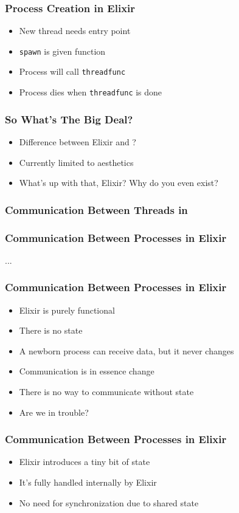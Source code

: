 \begin{frame}
    \frametitle{Process Creation in Elixir}
    \begin{itemize}
        \item New thread needs entry point
        \item \texttt{spawn} is given function
        \item Process will call \texttt{threadfunc}
        \item Process dies when \texttt{threadfunc} is done
    \end{itemize}
\end{frame}

\begin{frame}
    \frametitle{So What's The Big Deal?}
    \begin{itemize}
        \item Difference between Elixir and \csharp?
        \item Currently limited to aesthetics
        \item What's up with that, Elixir? Why do you even exist?
    \end{itemize}
\end{frame}

\begin{frame}
    \frametitle{Communication Between Threads in \csharp}
\end{frame}

\begin{frame}
    \frametitle{Communication Between Processes in Elixir}
    \begin{center}
        \Huge ...
    \end{center}
\end{frame}

\begin{frame}
    \frametitle{Communication Between Processes in Elixir}
    \begin{itemize}
        \item Elixir is purely functional
        \item There is no state
        \item A newborn process can receive data, but it never changes
        \item Communication is in essence change
        \item There is no way to communicate without state
        \item Are we in trouble?
    \end{itemize}
\end{frame}

\begin{frame}
    \frametitle{Communication Between Processes in Elixir}
    \begin{itemize}
        \item Elixir introduces a tiny bit of state
        \item It's fully handled internally by Elixir
        \item No need for synchronization due to shared state
    \end{itemize}
\end{frame}
